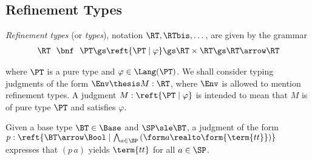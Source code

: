 \subsection{Refinement Types}
\label{sec:reft}


\noindent
\emph{Refinement types} (or \emph{types}), notation $\RT,\RTbis,\dots$,
are given by the grammar
\begin{equation*}
\begin{array}{r @{\ \ }c@{\ \ } l}
    \RT
&   \bnf
&   \PT
\gs \reft{\PT \mid \varphi}
\gs \RT \times \RT
\gs \RT \arrow \RT
\end{array}
\end{equation*}

\noindent
where $\PT$ is a pure type and $\varphi \in \Lang(\PT)$.
%
We shall consider typing judgments of the form
$\Env \thesis M : \RT$,
where $\Env$ is allowed to mention refinement types.
A judgment
$M : \reft{\PT \mid \varphi}$
is intended to mean that $M$ is of pure type $\PT$ and satisfies $\varphi$.


\begin{example}
\label{ex:reft:base}
Given a base type $\BT \in \Base$ and $\SP \sle \BT$,
a judgment of the form
\(
  p :
  \reft{\BT \arrow \Bool
  \mid
  \bigwedge_{a \in \SP}\left(\form a \realto \form{\term{tt}} \right)}
\)
expresses that 
$(p\, a)$ yields $\term{tt}$ for all $a \in \SP$.
\end{example}





